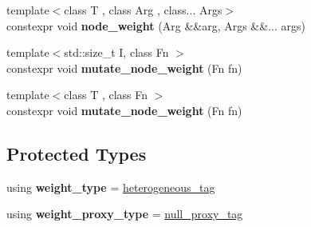 \begin{DoxyCompactItemize}
\item 
\mbox{\label{classsequoia_1_1maths_1_1graph__impl_1_1heterogeneous__node__storage_ab181e0313e08076845ba895583df8f10}} 
{\footnotesize template$<$class T , class Arg , class... Args$>$ }\\constexpr void {\bfseries node\+\_\+weight} (Arg \&\&arg, Args \&\&... args)
\item 
\mbox{\label{classsequoia_1_1maths_1_1graph__impl_1_1heterogeneous__node__storage_a5b4baef8c49807d65f390f1d7e836612}} 
{\footnotesize template$<$std\+::size\+\_\+t I, class Fn $>$ }\\constexpr void {\bfseries mutate\+\_\+node\+\_\+weight} (Fn fn)
\item 
\mbox{\label{classsequoia_1_1maths_1_1graph__impl_1_1heterogeneous__node__storage_a5b4baef8c49807d65f390f1d7e836612}} 
{\footnotesize template$<$class T , class Fn $>$ }\\constexpr void {\bfseries mutate\+\_\+node\+\_\+weight} (Fn fn)
\end{DoxyCompactItemize}
\subsection*{Protected Types}
\begin{DoxyCompactItemize}
\item 
\mbox{\label{classsequoia_1_1maths_1_1graph__impl_1_1heterogeneous__node__storage_ab9456e4210b53063ac7b54b31d1f6dfe}} 
using {\bfseries weight\+\_\+type} = \mbox{\hyperlink{structsequoia_1_1maths_1_1graph__impl_1_1heterogeneous__tag}{heterogeneous\+\_\+tag}}
\item 
\mbox{\label{classsequoia_1_1maths_1_1graph__impl_1_1heterogeneous__node__storage_ae23f10e26a4e7e8835e2a7447a51a231}} 
using {\bfseries weight\+\_\+proxy\+\_\+type} = \mbox{\hyperlink{structsequoia_1_1maths_1_1graph__impl_1_1heterogeneous__node__storage_1_1null__proxy__tag}{null\+\_\+proxy\+\_\+tag}}
\end{DoxyCompactItemize}
